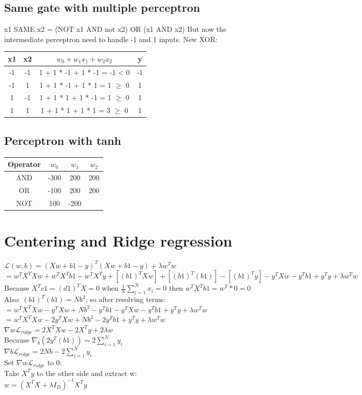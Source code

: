 \subsection{Same gate with multiple perceptron}
x1 SAME x2 = (NOT x1 AND not x2) OR (x1 AND x2) But now the intermediate perceptron
need to handle -1 and 1 inputs. New XOR:
\begin{tabular}{c | c | c | c}
	x1 & x2 & $w_{0}+ w_{1}x_{1}+ w_{2}x_{2}$ & y  \\
	\hline
	-1 & -1 & 1 + 1 * -1 + 1 * -1 = -1 < 0    & -1 \\
	\hline
	-1 & 1  & 1 + 1 * -1 + 1 * 1 = 1 $\geq$ 0 & 1  \\
	\hline
	1  & -1 & 1 + 1 * 1 + 1 * -1 = 1 $\geq$ 0 & 1  \\
	\hline
	1  & 1  & 1 + 1 * 1 + 1 * 1 = 3 $\geq$ 0  & 1  \\
\end{tabular}
\subsection{Perceptron with tanh}
\begin{tabular}{c | c | c| c}
	Operator & $w_{0}$ & $w_{1}$ & $w_{2}$ \\
	\hline
	AND      & -300    & 200     & 200     \\
	\hline
	OR       & -100    & 200     & 200     \\
	\hline
	NOT      & 100     & -200     \\
\end{tabular}

\section{Centering and Ridge regression}
$\mathcal{L}(w,b)=(Xw +b1-y)^{T}(Xw +b1-y)+\lambda w^{T}w$\\
$=w^{T}X^{T}Xw+w^{T}X^{T}b1-w^{T}X^{T}y +[(b1)^{T}Xw]+[(b1)^{T}(b1)]-[(b1)^{T}y]-
y^{T}Xw-y^{T}b1+y^{T}y+\lambda w^{T}w$\\ Because $X^{T}c1=(d1)^{T}X=0$ when $\frac{1}{N}
\sum_{i=1}^{N}x_{i}= 0$ then $w^{T}X^{T}b1=w^{T}*0=0$\\ Also: $(b1)^{T}(b1) = Nb^{2}$,
so after resolving terms:\\
$=w^{T}X^{T}Xw-y^{T}Xw +Nb^{2}-y^{T}b1-y^{T}Xw-y^{T}b1 +y^{T}y +\lambda w^{T}w$\\
$=w^{T}X^{T}Xw-2y^{T}Xw +Nb^{2}-2y^{T}b1+y^{T}y +\lambda w^{T}w$\\
$\nabla{w}\mathcal{L}_{ridge}=2X^{T}Xw-2X^{T}y+2\lambda w$\\ Because $\nabla_{b}(
2y^{T}(b1))=2\sum_{i=1}^{N}y_{i}$\\
$\nabla{b}\mathcal{L}_{ridge}=2N b-2\sum_{i=1}^{N}y_{i}$\\ Set $\nabla{w}\mathcal{L}
_{ridge}$ to 0:\\ Take $X^{T}y$ to the other side and extract w:\\ $w=(X^{T}X+\lambda
I_{D})^{-1}X^{T}y$\\
